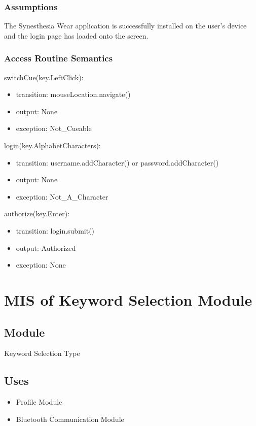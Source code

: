 \documentclass[12pt, titlepage]{article}
\begin{document}
\subsubsection{Assumptions}

The Synesthesia Wear application is successfully installed on the user's device and the login page has loaded onto the screen. 

\subsubsection{Access Routine Semantics}

\noindent switchCue(key.LeftClick):
\begin{itemize}
\item transition: mouseLocation.navigate() 
\item output: None
\item exception: Not\_Cueable 
\end{itemize}

\noindent login(key.AlphabetCharacters):
\begin{itemize}
\item transition: username.addCharacter() or password.addCharacter()
\item output: None
\item exception: Not\_A\_Character 
\end{itemize}


\noindent authorize(key.Enter):
\begin{itemize}
\item transition: login.submit() 
\item output: Authorized
\item exception: None 
\end{itemize}

\newpage 

\section{MIS of Keyword Selection Module} \label{Keyword Selection Module}
\subsection{Module}
Keyword Selection Type

\subsection{Uses}
\begin{itemize}
  \item Profile Module
  \item Bluetooth Communication Module
  \end{itemize}
\end{document}
